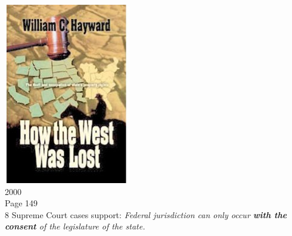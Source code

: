 \begin{frame}
    \begin{columns}[c]
            \centering
            \includegraphics[height=0.75\textheight]{img/htwwl.png} \\
            2000 \\
            Page 149 \\
            { \Large 8 Supreme Court cases support: \emph{Federal jurisdiction can only occur \textbf{{\color{red} with the consent}} of the legislature of the state. }}
    \end{columns}
\end{frame}

